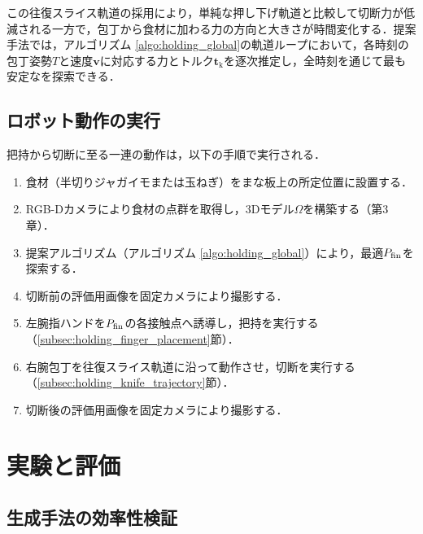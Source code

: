 この往復スライス軌道の採用により，単純な押し下げ軌道と比較して切断力が低減される一方で，包丁から食材に加わる力の方向と大きさが時間変化する．提案手法では，アルゴリズム \ref{algo:holding_global}の軌道ループにおいて，各時刻の包丁姿勢$T$と速度$\bm{v}$に対応する力とトルク$\bm{t}_{\mathrm{k}}$を逐次推定し，全時刻を通じて最も安定な{\nameholdingpointset}を探索できる．


\subsection{ロボット動作の実行}
\label{subsec:holding_dual_arm_execution}

把持から切断に至る一連の動作は，以下の手順で実行される．

\begin{enumerate}
    \item 食材（半切りジャガイモまたは玉ねぎ）をまな板上の所定位置に設置する．
    \item RGB-Dカメラにより食材の点群を取得し，3Dモデル$\Omega$を構築する（第3章）．
    \item 提案アルゴリズム（アルゴリズム \ref{algo:holding_global}）により，最適{\nameholdingpointset}$\equholdingpointset[fin]$を探索する．
    \item 切断前の評価用画像を固定カメラにより撮影する．
    \item 左腕指ハンドを$\equholdingpointset[fin]$の各接触点へ誘導し，把持を実行する（\ref{subsec:holding_finger_placement}節）．
    \item 右腕包丁を往復スライス軌道に沿って動作させ，切断を実行する（\ref{subsec:holding_knife_trajectory}節）．
    \item 切断後の評価用画像を固定カメラにより撮影する．
\end{enumerate}

\section{実験と評価}
\label{sec:holding_experiments}

\subsection{{\namegraspforce}生成手法の効率性検証}
\label{subsec:holding_exp_force_generation}

